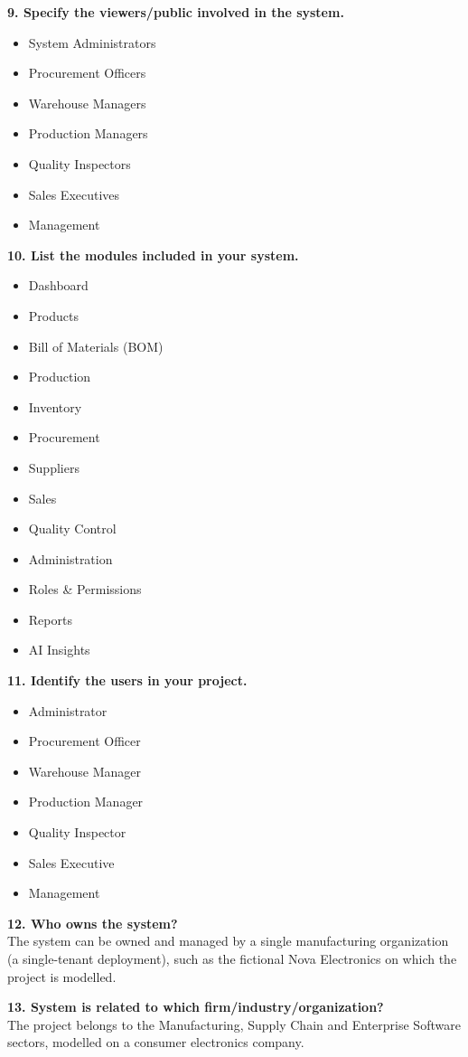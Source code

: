 \documentclass[12pt,a4paper]{report}
\begin{document}
\textbf{9. Specify the viewers/public involved in the system.}
\begin{itemize}
\item System Administrators
\item Procurement Officers
\item Warehouse Managers
\item Production Managers
\item Quality Inspectors
\item Sales Executives
\item Management
\end{itemize}

\textbf{10. List the modules included in your system.}
\begin{itemize}
\item Dashboard
\item Products
\item Bill of Materials (BOM)
\item Production
\item Inventory
\item Procurement
\item Suppliers
\item Sales
\item Quality Control
\item Administration
\item Roles \& Permissions
\item Reports
\item AI Insights
\end{itemize}

\textbf{11. Identify the users in your project.}
\begin{itemize}
\item Administrator
\item Procurement Officer
\item Warehouse Manager
\item Production Manager
\item Quality Inspector
\item Sales Executive
\item Management
\end{itemize}

\textbf{12. Who owns the system?}\\
The system can be owned and managed by a single manufacturing organization (a single-tenant deployment), such as the fictional Nova Electronics on which the project is modelled.

\textbf{13. System is related to which firm/industry/organization?}\\
The project belongs to the Manufacturing, Supply Chain and Enterprise Software sectors, modelled on a consumer electronics company.
\end{document}
